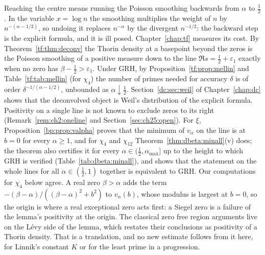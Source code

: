 \begin{remark}\label{gl:rem:buys}
Reaching the centre means running the Poisson smoothing backwards from $\alpha$ to $\tfrac12$. In the variable $x=\log n$ the smoothing multiplies the weight of $n$ by $n^{-(\alpha-1/2)}$, so undoing it replaces $n^{-\alpha}$ by the divergent $n^{-1/2}$: the backward step is the explicit formula, and it is ill posed. Chapter~\ref{chap:tf} measures its cost. By Theorem~\ref{tf:thm:deconv} the Thorin density at a basepoint beyond the zeros is the Poisson smoothing of a positive measure down to the line $\Re s=\tfrac12+\varepsilon_1$ exactly when no zero has $\beta-\tfrac12>\varepsilon_1$. Under GRH, by Proposition~\ref{tf:prop:mellin} and Table~\ref{tf:tab:mellin} (for $\chi_4$) the number of primes needed for accuracy $\delta$ is of order $\delta^{-1/(\alpha-1/2)}$, unbounded as $\alpha\downarrow\tfrac12$. Section~\ref{dc:sec:weil} of Chapter~\ref{chap:dc} shows that the deconvolved object is Weil's distribution of the explicit formula. Positivity on a single line is not known to exclude zeros to its right (Remark~\ref{rem:ch2:oneline} and Section~\ref{sec:ch25:open}). For $\xi$, Proposition~\ref{bp:prop:valpha} proves that the minimum of $v_\alpha$ on the line is at $b=0$ for every $\alpha\ge1$, and for $\chi_4$ and $\chi_{12}$ Theorem~\ref{thm:dbeta:minall}(v) does; the theorem also certifies it for every $\alpha\in(\tfrac12,\alpha_{\max}]$ up to the height to which GRH is verified (Table~\ref{tab:dbeta:minall}), and shows that the statement on the whole lines for all $\alpha\in(\tfrac12,1)$ together is equivalent to GRH. Our computations for $\chi_4$ below agree. A real zero $\beta>\alpha$ adds the term $-(\beta-\alpha)/((\beta-\alpha)^2+b^2)$ to $v_\alpha(b)$, whose modulus is largest at $b=0$, so the origin is where a real exceptional zero acts first: a Siegel zero is a failure of the lemma's positivity at the origin. The classical zero free region arguments live on the L\'evy side of the lemma, which restates their conclusions as positivity of a Thorin density. That is a translation, and no new estimate follows from it here, for Linnik's constant $K$ or for the least prime in a progression.
\end{remark}

